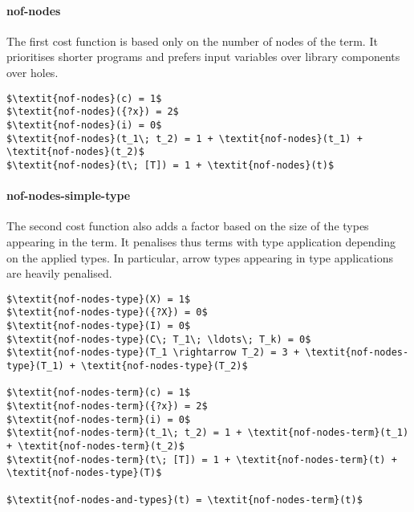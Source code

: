   \paragraph{nof-nodes}
The first cost function is based only on the number of nodes of the term. It prioritises shorter programs and prefers input variables over library components over holes.
%
\begin{lstlisting}[style=algorithm]
$\textit{nof-nodes}(c) = 1$
$\textit{nof-nodes}({?x}) = 2$
$\textit{nof-nodes}(i) = 0$
$\textit{nof-nodes}(t_1\; t_2) = 1 + \textit{nof-nodes}(t_1) + \textit{nof-nodes}(t_2)$
$\textit{nof-nodes}(t\; [T]) = 1 + \textit{nof-nodes}(t)$
\end{lstlisting}
%
  \paragraph{nof-nodes-simple-type}
The second cost function also adds a factor based on the size of the types appearing in the term. It penalises thus terms with type application depending on the applied types. In particular, arrow types appearing in type applications are heavily penalised.
%
\begin{lstlisting}[style=algorithm]
$\textit{nof-nodes-type}(X) = 1$
$\textit{nof-nodes-type}({?X}) = 0$
$\textit{nof-nodes-type}(I) = 0$
$\textit{nof-nodes-type}(C\; T_1\; \ldots\; T_k) = 0$
$\textit{nof-nodes-type}(T_1 \rightarrow T_2) = 3 + \textit{nof-nodes-type}(T_1) + \textit{nof-nodes-type}(T_2)$

$\textit{nof-nodes-term}(c) = 1$
$\textit{nof-nodes-term}({?x}) = 2$
$\textit{nof-nodes-term}(i) = 0$
$\textit{nof-nodes-term}(t_1\; t_2) = 1 + \textit{nof-nodes-term}(t_1) + \textit{nof-nodes-term}(t_2)$
$\textit{nof-nodes-term}(t\; [T]) = 1 + \textit{nof-nodes-term}(t) + \textit{nof-nodes-type}(T)$

$\textit{nof-nodes-and-types}(t) = \textit{nof-nodes-term}(t)$
\end{lstlisting}

